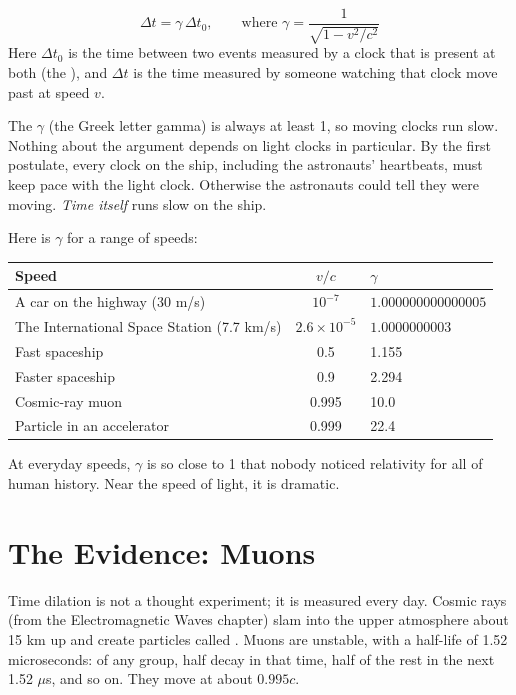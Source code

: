 \begin{mdframed}[style = important, frametitle = {Time Dilation}]
$$\Delta t = \gamma\,\Delta t_0, \qquad \text{where } \gamma = \frac{1}{\sqrt{1 - v^2/c^2}}$$
Here $\Delta t_0$ is the time between two events measured by a clock that is present at both (the
), and $\Delta t$ is the time measured by someone watching that clock move past at
speed $v$.
\end{mdframed}

The  $\gamma$ (the Greek letter gamma) is always at least 1, so moving clocks
run slow. Nothing about the argument depends on light clocks in particular. By the first postulate,
every clock on the ship, including the astronauts' heartbeats, must keep pace with the light clock.
Otherwise the astronauts could tell they were moving. \emph{Time itself} runs slow on the ship.

Here is $\gamma$ for a range of speeds:
\begin{center}
\begin{tabular}{l|c|l}
Speed & $v/c$ & $\gamma$ \\
\hline
A car on the highway (30 m/s) & $10^{-7}$ & $1.000000000000005$ \\
The International Space Station (7.7 km/s) & $2.6 \times 10^{-5}$ & $1.0000000003$ \\
Fast spaceship & 0.5 & 1.155 \\
Faster spaceship & 0.9 & 2.294 \\
Cosmic-ray muon & 0.995 & 10.0 \\
Particle in an accelerator & 0.999 & 22.4 \\
\end{tabular}
\end{center}
At everyday speeds, $\gamma$ is so close to 1 that nobody noticed relativity for all of human
history. Near the speed of light, it is dramatic.

\section{The Evidence: Muons}
Time dilation is not a thought experiment; it is measured every day. Cosmic rays (from the
Electromagnetic Waves chapter) slam into the upper atmosphere about 15 km up and create
particles called . Muons are unstable, with a half-life of 1.52 microseconds:
of any group, half decay in that time, half of the rest in the next 1.52 $\mu$s, and so on.
They move at about $0.995c$.

